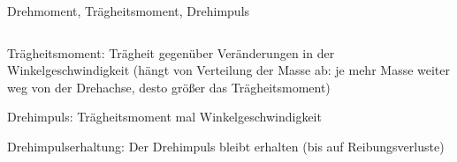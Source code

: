 \documentclass{beamer}
\begin{document}
\begin{frame}{Drehmoment, Trägheitsmoment, Drehimpuls}
\begin{columns}[c]
\begin{column}{6cm}
Trägheitsmoment: Trägheit gegenüber Veränderungen in der Winkelgeschwindigkeit (hängt von Verteilung der Masse ab: je mehr Masse weiter weg von der Drehachse, desto größer das Trägheitsmoment)

\pause

Drehimpuls: Trägheitsmoment mal Winkelgeschwindigkeit 

\pause

Drehimpulserhaltung: Der Drehimpuls bleibt  erhalten (bis auf Reibungsverluste)

\end{column}



\end{columns}



\end{frame}




 
\end{document}
